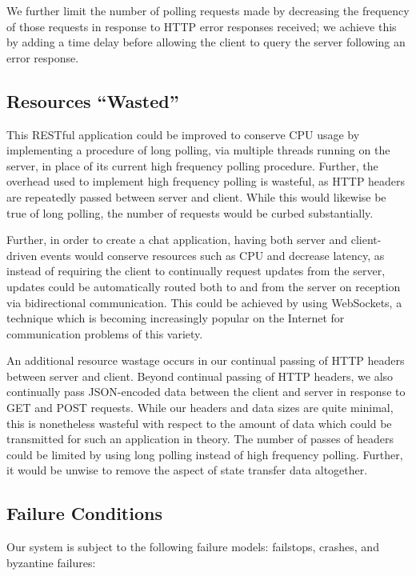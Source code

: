 \documentclass[11pt]{article} %
\begin{document}
We further limit the number of polling requests made by decreasing the frequency of those requests in response to HTTP error responses received; we achieve this by adding a time delay before allowing the client to query the server following an error response. 

\subsection{Resources ``Wasted''}

This RESTful application could be improved to conserve CPU usage by implementing a procedure of long polling, via multiple threads running on the server, in place of its current high frequency polling procedure. Further, the overhead used to implement high frequency polling is wasteful, as HTTP headers are repeatedly passed between server and client. While this would likewise be true of long polling, the number of requests would be curbed substantially. 

Further, in order to create a chat application, having both server and client-driven events would conserve resources such as CPU and decrease latency, as instead of requiring the client to continually request updates from the server, updates could be automatically routed both to and from the server on reception via bidirectional communication. This could be achieved by using WebSockets, a technique which is becoming increasingly popular on the Internet for communication problems of this variety. 

An additional resource wastage occurs in our continual passing of HTTP headers between server and client. Beyond continual passing of HTTP headers, we also continually pass JSON-encoded data between the client and server in response to GET and POST requests. While our headers and data sizes are quite minimal, this is nonetheless wasteful with respect to the amount of data which could be transmitted for such an application in theory. The number of passes of headers could be limited by using long polling instead of high frequency polling. Further, it would be unwise to remove the aspect of state transfer data altogether. 

\subsection{Failure Conditions}

Our system is subject to the following failure models: failstops, crashes, and byzantine failures: 
\end{document}
